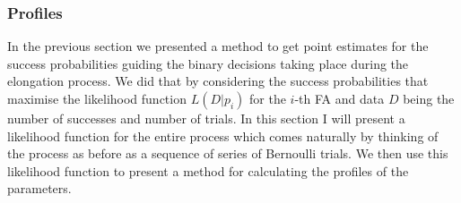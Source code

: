 \subsubsection{Profiles}
In the previous section we presented a method to get point estimates for the success
probabilities guiding the binary decisions taking place during the
elongation process. We did that by considering the success
probabilities that maximise the likelihood function $L(D|p_i)$ for
the $i$-th FA and data $D$ being the number of successes and number of
trials. In this section I will present a likelihood function for the
entire process which comes naturally by thinking of the process as
before as a sequence of series of Bernoulli trials. We then use this
likelihood function to present a method for calculating the profiles
of the parameters.

